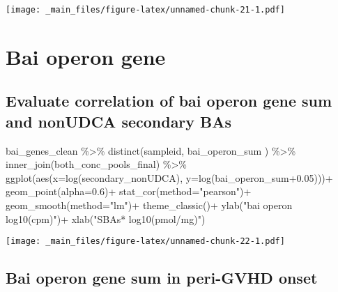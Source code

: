 \documentclass[
]{book}
\newenvironment{Shaded}{\begin{snugshade}}{\end{snugshade}}
\newcommand{\AttributeTok}[1]{\textcolor[rgb]{0.77,0.63,0.00}{#1}}
\newcommand{\FloatTok}[1]{\textcolor[rgb]{0.00,0.00,0.81}{#1}}
\newcommand{\FunctionTok}[1]{\textcolor[rgb]{0.00,0.00,0.00}{#1}}
\newcommand{\NormalTok}[1]{#1}
\newcommand{\SpecialCharTok}[1]{\textcolor[rgb]{0.00,0.00,0.00}{#1}}
\newcommand{\StringTok}[1]{\textcolor[rgb]{0.31,0.60,0.02}{#1}}
\begin{document}
\texttt{[image: \_main\_files/figure-latex/unnamed-chunk-21-1.pdf]}

\hypertarget{bai-operon-gene}{%
\section{Bai operon gene}\label{bai-operon-gene}}

\hypertarget{evaluate-correlation-of-bai-operon-gene-sum-and-nonudca-secondary-bas}{%
\subsection{Evaluate correlation of bai operon gene sum and nonUDCA secondary BAs}\label{evaluate-correlation-of-bai-operon-gene-sum-and-nonudca-secondary-bas}}

\begin{Shaded}
\begin{Highlighting}[]
\NormalTok{bai\_genes\_clean }\SpecialCharTok{\%\textgreater{}\%} 
  \FunctionTok{distinct}\NormalTok{(sampleid, bai\_operon\_sum ) }\SpecialCharTok{\%\textgreater{}\%} 
  \FunctionTok{inner\_join}\NormalTok{(both\_conc\_pools\_final) }\SpecialCharTok{\%\textgreater{}\%} 
  \FunctionTok{ggplot}\NormalTok{(}\FunctionTok{aes}\NormalTok{(}\AttributeTok{x=}\FunctionTok{log}\NormalTok{(secondary\_nonUDCA), }\AttributeTok{y=}\FunctionTok{log}\NormalTok{(bai\_operon\_sum}\FloatTok{+0.05}\NormalTok{)))}\SpecialCharTok{+}
  \FunctionTok{geom\_point}\NormalTok{(}\AttributeTok{alpha=}\FloatTok{0.6}\NormalTok{)}\SpecialCharTok{+}
  \FunctionTok{stat\_cor}\NormalTok{(}\AttributeTok{method=}\StringTok{"pearson"}\NormalTok{)}\SpecialCharTok{+}
  \FunctionTok{geom\_smooth}\NormalTok{(}\AttributeTok{method=}\StringTok{"lm"}\NormalTok{)}\SpecialCharTok{+}
  \FunctionTok{theme\_classic}\NormalTok{()}\SpecialCharTok{+}
  \FunctionTok{ylab}\NormalTok{(}\StringTok{"bai operon log10(cpm)"}\NormalTok{)}\SpecialCharTok{+}
  \FunctionTok{xlab}\NormalTok{(}\StringTok{"SBAs* log10(pmol/mg)"}\NormalTok{)}
\end{Highlighting}
\end{Shaded}

\texttt{[image: \_main\_files/figure-latex/unnamed-chunk-22-1.pdf]}

\hypertarget{bai-operon-gene-sum-in-peri-gvhd-onset}{%
\subsection{Bai operon gene sum in peri-GVHD onset}\label{bai-operon-gene-sum-in-peri-gvhd-onset}}
\end{document}
